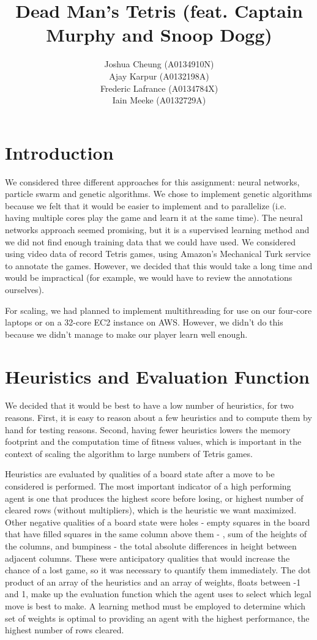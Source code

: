\documentclass[10pt,a4paper]{report}
\title{Dead Man's Tetris (feat. Captain Murphy and Snoop Dogg)}
\author{Joshua Cheung (A0134910N)\\Ajay Karpur (A0132198A)\\Frederic Lafrance (A0134784X)\\Iain Meeke (A0132729A)}
\begin{document}
\maketitle

\tableofcontents

\section{Introduction}
We considered three different approaches for this assignment: neural networks, particle swarm and genetic algorithms. We chose to implement genetic algorithms because we felt that it would be easier to implement and to parallelize (i.e. having multiple cores play the game and learn it at the same time). The neural networks approach seemed promising, but it is a supervised learning method and we did not find enough training data that we could have used. We considered using video data of record Tetris games, using Amazon's Mechanical Turk service to annotate the games. However, we decided that this would take a long time and would be impractical (for example, we would have to review the annotations ourselves).

For scaling, we had planned to implement multithreading for use on our four-core laptops or on a 32-core EC2 instance on AWS. However, we didn't do this because we didn't manage to make our player learn well enough.

\section{Heuristics and Evaluation Function}
We decided that it would be best to have a low number of heuristics, for two reasons. First, it is easy to reason about a few heuristics and to compute them by hand for testing reasons. Second, having fewer heuristics lowers the memory footprint and the computation time of fitness values, which is important in the context of scaling the algorithm to large numbers of Tetris games.

Heuristics are evaluated by qualities of a board state after a move to be considered is performed. The most important indicator of a high performing agent is one that produces the highest score before losing, or highest number of cleared rows (without multipliers), which is the heuristic we want maximized. Other negative qualities of a board state were holes - empty squares in the board that have filled squares in the same column above them - , sum of the heights of the columns, and bumpiness - the total absolute differences in height between adjacent columns. These were anticipatory qualities that would increase the chance of a lost game, so it was necessary to quantify them immediately. The dot product of an array of the heuristics and an array of weights, floats between -1 and 1, make up the evaluation function which the agent uses to select which legal move is best to make. A learning method must be employed to determine which set of weights is optimal to providing an agent with the highest performance, the highest number of rows cleared.
\end{document}
